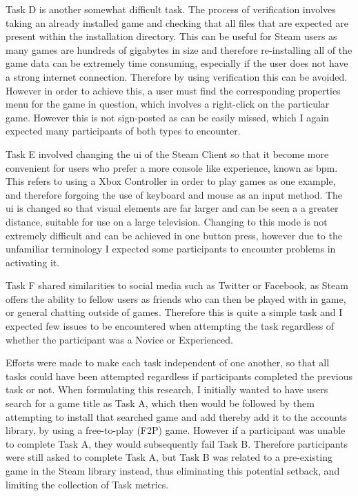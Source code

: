 Task D is another somewhat difficult task. The process of verification involves taking an already installed game and checking that all files that are expected are present within the installation directory. This can be useful for Steam users as many games are hundreds of gigabytes in size and therefore re-installing all of the game data can be extremely time consuming, especially if the user does not have a strong internet connection. Therefore by using verification this can be avoided. However in order to achieve this, a user must find the corresponding properties menu for the game in question, which involves a right-click on the particular game. However this is not sign-posted as can be easily missed, which I again expected many participants of both types to encounter.  

Task E involved changing the \gls{ui} of the Steam Client so that it become more convenient for users who prefer a more console like experience, known as \gls{bpm}. This refers to using a Xbox Controller in order to play games as one example, and therefore forgoing the use of keyboard and mouse as an input method. The \gls{ui} is changed so that visual elements are far larger and can be seen a a greater distance, suitable for use on a large television. Changing to this mode is not extremely difficult and can be achieved in one button press, however due to the unfamiliar terminology I expected some participants to encounter problems in activating it. 

Task F shared similarities to social media such as Twitter or Facebook, as Steam offers the ability to fellow users as friends who can then be played with in game, or general chatting outside of games. Therefore this is quite a simple task and I expected few issues to be encountered when attempting the task regardless of whether the participant was a Novice or Experienced. 

 Efforts were made to make each task independent of one another, so that all tasks could have been attempted regardless if participants completed the previous task or not. When formulating this research, I initially wanted to have users search for a game title as Task A, which then would be followed by them attempting to install that searched game and add thereby add it to the accounts library, by using a free-to-play (F2P) game. However if a participant was unable to complete Task A, they would subsequently fail Task B. Therefore participants were still asked to complete Task A, but Task B was related to a pre-existing game in the Steam library instead, thus eliminating this potential setback, and limiting the collection of Task metrics. 

